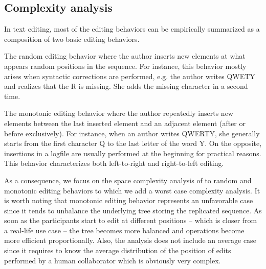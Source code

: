 

\subsection{Complexity analysis}
\label{subsec:complexity}

In text editing, most of the editing behaviors can be empirically summarized
as a composition of two basic editing behaviors.
\begin{inparaenum}[(i)]
\item The random editing behavior where the author inserts new elements at what
  appears random positions in the sequence. For instance, this behavior mostly
  arises when syntactic corrections are performed, e.g. the author writes QWETY
  and realizes that the R is missing. She adds the missing character in a second
  time.
\item The monotonic editing behavior where the author repeatedly inserts new
  elements between the last inserted element and an adjacent element (after or
  before exclusively). For instance, when an author writes QWERTY, she generally
  starts from the first character Q to the last letter of the word Y. On the
  opposite, insertions in a logfile are usually performed at the beginning for
  practical reasons. This behavior characterizes both left-to-right and
  right-to-left editing.
\end{inparaenum}

As a consequence, we focus on the space complexity analysis of \LSEQ to random
and monotonic editing behaviors to which we add a worst case complexity
analysis. It is worth noting that monotonic editing behavior represents an
unfavorable case since it tends to unbalance the underlying tree storing the
replicated sequence. As soon as the participants start to edit at different
positions -- which is closer from a real-life use case -- the tree becomes more
balanced and operations become more efficient proportionally. Also, the
analysis does not include an average case since it requires to know the average
distribution of the position of edits performed by a human collaborator which is
obviously very complex.

